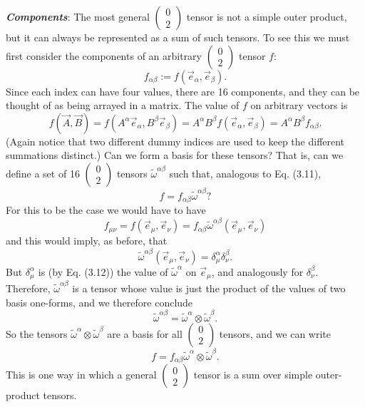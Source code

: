 \documentclass[12pt]{book}
\begin{document}
    \textit{\textbf{Components}}: The most general \(\left(\begin{array}{c} 0 \\ 2 \end{array}\right)\) tensor is not a simple outer product, but it can always be represented as a sum of such tensors. To see this we must first consider the components of an arbitrary \(\left(\begin{array}{c} 0 \\ 2 \end{array}\right)\) tensor \(f\):
    \[
    f_{\alpha\beta} := f(\vec{e}_\alpha, \vec{e}_\beta). \tag{3.21}
    \]
    Since each index can have four values, there are 16 components, and they can be thought of as being arrayed in a matrix. The value of \(f\) on arbitrary vectors is
    \[
    f(\vec{A},\vec{B}) = f(A^\alpha \vec{e}_\alpha, B^\beta \vec{e}_\beta)
    = A^\alpha B^\beta f(\vec{e}_\alpha, \vec{e}_\beta)
    = A^\alpha B^\beta f_{\alpha\beta}. \tag{3.22}
    \]
    (Again notice that two different dummy indices are used to keep the different summations distinct.) Can we form a basis for these tensors? That is, can we define a set of 16 \(\left(\begin{array}{c} 0 \\ 2 \end{array}\right)\) tensors \(\tilde{\omega}^{\alpha\beta}\) such that, analogous to Eq. (3.11),
    \[
    f = f_{\alpha\beta} \tilde{\omega}^{\alpha\beta}? \tag{3.23}
    \]
    For this to be the case we would have to have
    \[
    f_{\mu\nu} = f(\vec{e}_\mu, \vec{e}_\nu) = f_{\alpha\beta} \tilde{\omega}^{\alpha\beta}(\vec{e}_\mu, \vec{e}_\nu)
    \]
    and this would imply, as before, that
    \[
    \tilde{\omega}^{\alpha\beta}(\vec{e}_\mu, \vec{e}_\nu) = \delta^\alpha_\mu \delta^\beta_\nu. \tag{3.24}
    \]
    But \(\delta^\alpha_\mu\) is (by Eq. (3.12)) the value of \(\tilde{\omega}^\alpha\) on \(\vec{e}_\mu\), and analogously for \(\delta^\beta_\nu\). Therefore, \(\tilde{\omega}^{\alpha\beta}\) is a tensor whose value is just the product of the values of two basis one-forms, and we therefore conclude
    \[
    \tilde{\omega}^{\alpha\beta} = \tilde{\omega}^\alpha \otimes \tilde{\omega}^\beta. \tag{3.25}
    \]
    So the tensors \(\tilde{\omega}^\alpha \otimes \tilde{\omega}^\beta\) are a basis for all \(\left(\begin{array}{c} 0 \\ 2 \end{array}\right)\) tensors, and we can write
    \[
    f = f_{\alpha\beta} \tilde{\omega}^\alpha \otimes \tilde{\omega}^\beta. \tag{3.26}
    \]
    This is one way in which a general \(\left(\begin{array}{c} 0 \\ 2 \end{array}\right)\) tensor is a sum over simple outer-product tensors.
    
\end{document}
